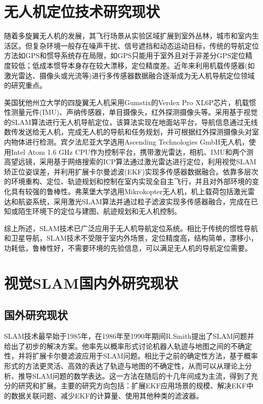 \section{无人机定位技术研究现状}
随着多旋翼无人机的发展，其飞行场景从实验区域扩展到室外丛林，城市和室内生活区。但复杂环境一般存在噪声干扰、信号遮挡和动态运动目标，传统的导航定位方法如GPS和惯导系统存在局限，如GPS只能用于室外且对于非差分GPS定位精度较低；低成本惯导本身存在较大漂移，定位精度差。近年来利用机载传感器(如激光雷达、摄像头或光流等)进行多传感器数据融合逐渐成为无人机导航定位领域的研究重点。

美国犹他州立大学\upcite{[1.4]}的四旋翼无人机采用Gumstix的Verdex Pro XL6P芯片，机载惯性测量元件(IMU)、声纳传感器，单目摄像头，红外探测摄像头等。采用基于视觉的SLAM算法进行无人机导航定位，该算法实现在地面站平台，导航信息通过无线数传发送给无人机，完成无人机的导航和任务规划，并可根据红外探测摄像头对室内物体进行检测。宾夕法尼亚大学\upcite{[1.5]}选用Ascending Technologies GmbH无人机，使用Intel Atom 1.6 GHz CPU作为控制平台，携带激光雷达，相机、IMU和两个测高望远镜，采用基于网络搜索的ICP算法通过激光雷达进行定位，利用视觉SLAM矫正位姿误差，并利用扩展卡尔曼滤波(EKF)实现多传感器数据融合。依靠多层次的环境重构、定位、轨迹规划和控制在室内实现全自主飞行，并且对外部环境的变化具有较强的鲁棒性。弗莱堡大学\upcite{[1.6]}选用Mikrokopter无人机，机上载荷包括激光雷达和航姿系统，采用激光SLAM算法并通过粒子滤波实现多传感器融合，完成在已知或陌生环境下的定位与建图、航迹规划和无人机控制。

综上所述，SLAM技术已广泛应用于无人机导航定位系统。相比于传统的惯性导航和卫星导航，SLAM技术不受限于室内外场景，定位精度高，结构简单，漂移小，功耗低，鲁棒性好，不需要环境的先验信息，可以满足无人机的导航定位需要。

\section{视觉SLAM国内外研究现状}
\subsection{国外研究现状}
SLAM技术最早始于1985年\upcite{[1.7]}，在1986年至1990年期间R.Smith提出了SLAM问题并给出了初步的解决方案\upcite{[1.8]}。他率先以概率形式讨论机器人轨迹与地图之间的不确定性，并将扩展卡尔曼滤波应用于SLAM问题。相比于之前的确定性方法，基于概率形式的方法更灵活、高效的表达了轨迹与地图的不确定性，从而可以从理论上分析、推导SLAM问题的数学表达。这一方法在随后的十几年间成为主流，得到了充分的研究和扩展\upcite{[1.9],[1.10]}。主要的研究方向包括：扩展EKF应用场景的规模\upcite{[1.11],[1.12]}、解决EKF中的数据关联问题\upcite{[1.13]}、减少EKF的计算量\upcite{[1.14]}、使用其他种类的滤波器\upcite{[1.15],[1.16]}。

